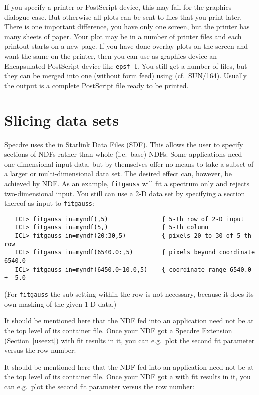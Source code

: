    If you specify a printer or PostScript device, this may fail for the
   graphics dialogue case.  But otherwise all plots can be sent to files
   that you print later.  There is one important difference, you have
   only one screen, but the printer has many sheets of paper.  Your plot
   may be in a number of printer files and each printout starts on a new
   page.  If you have done overlay plots on the screen and want the same
   on the printer, then you can use as graphics device an Encapsulated
   PostScript device like {\tt epsf\_l}.  You still get a number 
   of files, but they can be merged into one (without form feed) using
{\tt{}}
   (cf.\ SUN/164).  Usually the output is a complete PostScript file
   ready to be printed.


\section{\label{slice}Slicing data sets}

   Specdre uses the
   in Starlink Data Files (SDF). This allows the user to specify
   sections of NDFs rather than whole (i.e.\ base) NDFs. Some
   applications need one-dimensional input data, but by themselves offer
   no means to take a subset of a larger or multi-dimensional data
   set. The desired effect can, however, be achieved by NDF. As an
   example, {\tt fitgauss} will fit a spectrum only and rejects
   two-dimensional input. You still can use a 2-D data set by specifying
   a section thereof as input to {\tt fitgauss}:

\begin{verbatim}
   ICL> fitgauss in=myndf(,5)               { 5-th row of 2-D input
   ICL> fitgauss in=myndf(5,)               { 5-th column
   ICL> fitgauss in=myndf(20:30,5)          { pixels 20 to 30 of 5-th row
   ICL> fitgauss in=myndf(6540.0:,5)        { pixels beyond coordinate 6540.0
   ICL> fitgauss in=myndf(6450.0~10.0,5)    { coordinate range 6540.0 +- 5.0
\end{verbatim}

   (For {\tt fitgauss} the sub-setting within the row is not necessary,
   because it does its own masking of the given 1-D data.)

\begin{latexonly}
   It should be mentioned here that the NDF fed into an application need
   not be at the top level of its container file. Once your NDF got a
   Specdre Extension
(Section~\ref{useext})
   with fit results in it, you can e.g.\ plot the second fit parameter
   versus the row number:
\end{latexonly}
\begin{htmlonly}
   It should be mentioned here that the NDF fed into an application need
   not be at the top level of its container file. Once your NDF got a
   with fit results in it, you can e.g.\ plot the second fit parameter
   versus the row number:
\end{htmlonly}


